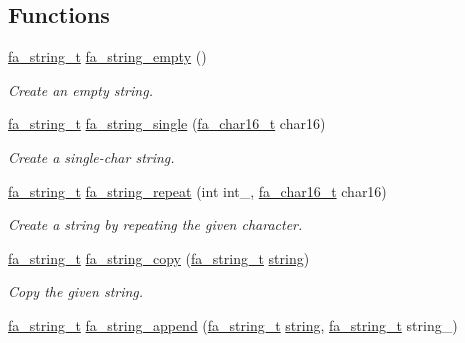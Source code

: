 \subsection*{Functions}
\begin{DoxyCompactItemize}
\item 
\hyperlink{group___fa_string_gacada63033b77bc6c39fa632ae199349b}{fa\-\_\-string\-\_\-t} \hyperlink{group___fa_string_ga41b5eaaca6caf7c02b5a84724547aaaf}{fa\-\_\-string\-\_\-empty} ()
\begin{DoxyCompactList}\small\item\em Create an empty string. \end{DoxyCompactList}\item 
\hyperlink{group___fa_string_gacada63033b77bc6c39fa632ae199349b}{fa\-\_\-string\-\_\-t} \hyperlink{group___fa_string_ga86d1752c468e584b6681e4d288cb8540}{fa\-\_\-string\-\_\-single} (\hyperlink{group___fa_ga33e83372a0abc1895fdad5fb4d15eae3}{fa\-\_\-char16\-\_\-t} char16)
\begin{DoxyCompactList}\small\item\em Create a single-\/char string. \end{DoxyCompactList}\item 
\hyperlink{group___fa_string_gacada63033b77bc6c39fa632ae199349b}{fa\-\_\-string\-\_\-t} \hyperlink{group___fa_string_gae8770737e599c69eb19873a79a662342}{fa\-\_\-string\-\_\-repeat} (int int\-\_\-, \hyperlink{group___fa_ga33e83372a0abc1895fdad5fb4d15eae3}{fa\-\_\-char16\-\_\-t} char16)
\begin{DoxyCompactList}\small\item\em Create a string by repeating the given character. \end{DoxyCompactList}\item 
\hyperlink{group___fa_string_gacada63033b77bc6c39fa632ae199349b}{fa\-\_\-string\-\_\-t} \hyperlink{group___fa_string_ga3cfc98affae422a383f3c32d421a027e}{fa\-\_\-string\-\_\-copy} (\hyperlink{group___fa_string_gacada63033b77bc6c39fa632ae199349b}{fa\-\_\-string\-\_\-t} \hyperlink{util_8h_a41106000aac73b61e4fc2ef9dd39a603}{string})
\begin{DoxyCompactList}\small\item\em Copy the given string. \end{DoxyCompactList}\item 
\hyperlink{group___fa_string_gacada63033b77bc6c39fa632ae199349b}{fa\-\_\-string\-\_\-t} \hyperlink{group___fa_string_gaa0c00dc6caa8ac95b39ae8763418f8f7}{fa\-\_\-string\-\_\-append} (\hyperlink{group___fa_string_gacada63033b77bc6c39fa632ae199349b}{fa\-\_\-string\-\_\-t} \hyperlink{util_8h_a41106000aac73b61e4fc2ef9dd39a603}{string}, \hyperlink{group___fa_string_gacada63033b77bc6c39fa632ae199349b}{fa\-\_\-string\-\_\-t} string\-\_\-)

\end{DoxyCompactItemize}
